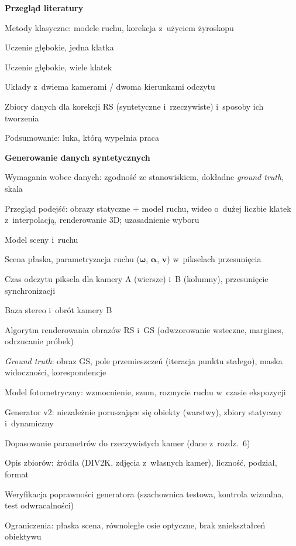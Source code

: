 \begin{toc}
\item \textbf{Przegląd literatury} \WS
  \begin{toc}
    \item Metody klasyczne: modele ruchu, korekcja z~użyciem żyroskopu
    \item Uczenie głębokie, jedna klatka
    \item Uczenie głębokie, wiele klatek
    \item Układy z~dwiema kamerami / dwoma kierunkami odczytu
    \item Zbiory danych dla korekcji RS (syntetyczne i~rzeczywiste) i~sposoby ich tworzenia
    \item Podsumowanie: luka, którą wypełnia praca
  \end{toc}

\item \textbf{Generowanie danych syntetycznych} \IK
  \begin{toc}
    \item Wymagania wobec danych: zgodność ze stanowiskiem, dokładne \emph{ground truth}, skala
    \item Przegląd podejść: obrazy statyczne + model ruchu, wideo o~dużej liczbie klatek
          z~interpolacją, renderowanie 3D; uzasadnienie wyboru
    \item Model sceny i~ruchu
      \begin{toc}
        \item Scena płaska, parametryzacja ruchu ($\boldsymbol\omega$, $\boldsymbol\alpha$, $\mathbf v$) w~pikselach przesunięcia
        \item Czas odczytu piksela dla kamery A (wiersze) i~B (kolumny), przesunięcie synchronizacji
        \item Baza stereo i~obrót kamery B
      \end{toc}
    \item Algorytm renderowania obrazów RS i~GS (odwzorowanie wsteczne, margines, odrzucanie próbek)
    \item \emph{Ground truth}: obraz GS, pole przemieszczeń (iteracja punktu stałego), maska widoczności, korespondencje
    \item Model fotometryczny: wzmocnienie, szum, rozmycie ruchu w~czasie ekspozycji
    \item Generator v2: niezależnie poruszające się obiekty (warstwy), zbiory statyczny i~dynamiczny
    \item Dopasowanie parametrów do rzeczywistych kamer (dane z~rozdz.~6)
    \item Opis zbiorów: źródła (DIV2K, zdjęcia z~własnych kamer), liczność, podział, format
    \item Weryfikacja poprawności generatora (szachownica testowa, kontrola wizualna, test odwracalności)
    \item Ograniczenia: płaska scena, równoległe osie optyczne, brak zniekształceń obiektywu
  \end{toc}


\end{toc}
